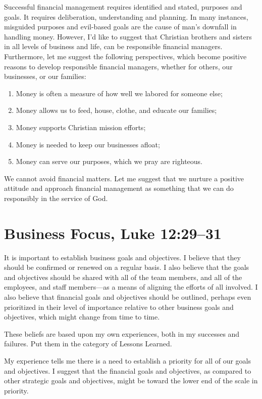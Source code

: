 \documentclass[12pt]{memoir}
\begin{document}
Successful financial management requires identified and stated, purposes
and goals. It requires deliberation, understanding and planning. In
many instances, misguided purposes and evil-based goals are the cause
of man's downfall in handling money. However, I'd like to suggest
that Christian brothers and sisters in all levels of business and
life, can be responsible financial managers. Furthermore, let me suggest
the following perspectives, which become positive reasons to develop
responsible financial managers, whether for others, our businesses,
or our families:
\begin{enumerate}
\item Money is often a measure of how well we labored for someone else; 
\item Money allows us to feed, house, clothe, and educate our families; 
\item Money supports Christian mission efforts; 
\item Money is needed to keep our businesses afloat; 
\item Money can serve our purposes, which we pray are righteous.
\end{enumerate}
We cannot avoid financial matters. Let me suggest that we nurture
a positive attitude and approach financial management as something
that we can do responsibly in the service of God.

\section[Business Focus]{Business Focus, Luke 12:29--31}

It is important to establish  business goals and objectives. I believe
that they should be confirmed or renewed on a regular basis. I also
believe that the goals and objectives should be shared with all of
the team members, and all of the employees, and staff members---as
a means of aligning the efforts of all involved. I also believe that
financial goals and objectives should be outlined, perhaps even prioritized
in their level of importance relative to other business goals and objectives,
which might change from time to time.

These beliefs are based upon
my own experiences, both in my successes and failures. Put them
in the category of Lessons Learned.

My experience tells me there is a need to establish a priority for all of our goals and objectives. I suggest that the financial
goals and objectives, as compared to other strategic goals and objectives,
might be toward the lower end of the scale in priority.
\end{document}
